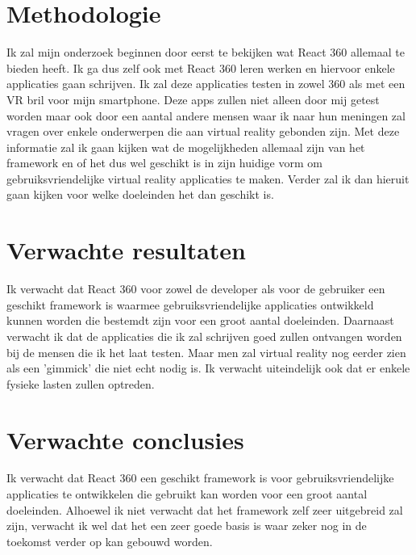 \section{Methodologie}
\label{sec:methodologie}

Ik zal mijn onderzoek beginnen door eerst te bekijken wat React 360 allemaal te bieden heeft. Ik ga dus zelf ook met React 360 leren werken en hiervoor enkele applicaties gaan schrijven. Ik zal deze applicaties testen in zowel 360\textdegree \hspace{0em} als met een VR bril voor mijn smartphone. Deze apps zullen niet alleen door mij getest worden maar ook door een aantal andere mensen waar ik naar hun meningen zal vragen over enkele onderwerpen die aan virtual reality gebonden zijn. Met deze informatie zal ik gaan kijken wat de mogelijkheden allemaal zijn van het framework en of het dus wel geschikt is in zijn huidige vorm om gebruiksvriendelijke virtual reality applicaties te maken. Verder zal ik dan hieruit gaan kijken voor welke doeleinden het dan geschikt is. 

\section{Verwachte resultaten}
\label{sec:verwachte_resultaten}

Ik verwacht dat React 360 voor zowel de developer als voor de gebruiker een geschikt framework is waarmee gebruiksvriendelijke applicaties ontwikkeld kunnen worden die bestemdt zijn voor een groot aantal doeleinden. Daarnaast verwacht ik dat de applicaties die ik zal schrijven goed zullen ontvangen worden bij de mensen die ik het laat testen. Maar men zal virtual reality nog eerder zien als een 'gimmick' die niet echt nodig is. Ik verwacht uiteindelijk ook dat er enkele fysieke lasten zullen optreden.
\section{Verwachte conclusies}
\label{sec:verwachte_conclusies}

Ik verwacht dat React 360 een geschikt framework is voor gebruiksvriendelijke applicaties te ontwikkelen die gebruikt kan worden voor een groot aantal doeleinden. Alhoewel ik niet verwacht dat het framework zelf zeer uitgebreid zal zijn, verwacht ik wel dat het een zeer goede basis is waar zeker nog in de toekomst verder op kan gebouwd worden.
